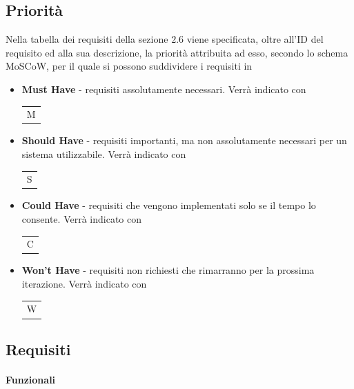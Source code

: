 \documentclass{article}
\begin{document}
\subsection{Priorità}
Nella tabella dei requisiti della sezione $2.6$ viene specificata, oltre all'ID del requisito ed alla sua descrizione, la priorità attribuita ad esso, secondo lo schema MoSCoW, per il quale si possono suddividere i requisiti in 
\begin{itemize}
    \item \textbf{Must Have} - requisiti assolutamente necessari. Verrà indicato con \hspace{.1cm} \begin{tabular}{c}
    \rowcolor{Green}
         M  \\ 
    \end{tabular}
    \item \textbf{Should Have} - requisiti importanti, ma non assolutamente necessari per un sistema utilizzabile. Verrà indicato con \hspace{.1cm} \begin{tabular}{c}
    \rowcolor{LimeGreen}
         S  \\ 
    \end{tabular}
    \item \textbf{Could Have} - requisiti che vengono implementati solo se il tempo lo consente. Verrà indicato con \hspace{.1cm} \begin{tabular}{c}
    \rowcolor{RedOrange}
         C  \\ 
    \end{tabular}
    \item \textbf{Won't Have} - requisiti non richiesti che rimarranno per la prossima iterazione. Verrà indicato con \hspace{.1cm} \begin{tabular}{c}
    \rowcolor{BrickRed}
         W  \\ 
    \end{tabular}
\end{itemize}


\subsection{Requisiti}
\paragraph{Funzionali}
\end{document}
